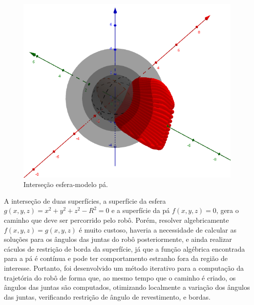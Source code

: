 \begin{figure}[!ht]
	\centering
	\includegraphics[width=\columnwidth]{method/figs/planejamento/intersecao_geogebra.png}
	\caption{Interseção esfera-modelo pá.}
	\label{fig::intergeo}
\end{figure}

A interseção de duas superfícies, a superfície da esfera
$g(x,y,z)=x^2+y^2+z^2-R^2=0$ e a superfície da pá $f(x,y,z)=0$, gera o caminho
que deve ser percorrido pelo robô. Porém, resolver algebricamente
$f(x,y,z)=g(x,y,z)$ é muito custoso, haveria a necessidade de
calcular as soluções para os ângulos das juntas do robô posteriormente, e ainda
realizar cáculos de restrição de borda da superfície, já que a função algébrica
encontrada para a pá é contínua e pode ter comportamento estranho fora da
região de interesse. Portanto, foi desenvolvido um método iterativo para a
computação da trajetória do robô de forma que, ao mesmo tempo que o caminho é
criado, os ângulos das juntas são computados, otimizando localmente a variação
dos ângulos das juntas, verificando restrição de ângulo de revestimento, e
bordas.

